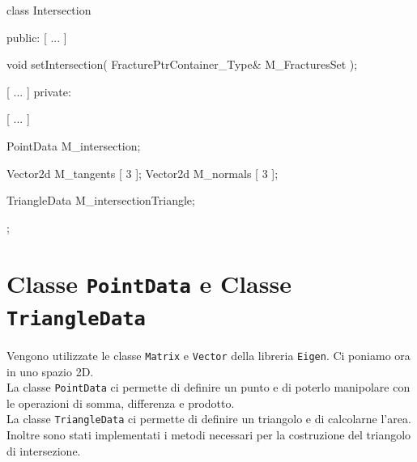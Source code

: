 \begin{Code03_03}[caption={Classe \texttt{Intersection}}]
class Intersection
{
 public:
	[ ... ]
	
	void setIntersection( FracturePtrContainer_Type& M_FracturesSet );
	
	[ ... ]
 private:
	
	[ ... ]	
	
	PointData M_intersection;
	
	Vector2d M_tangents [ 3 ];
	Vector2d M_normals [ 3 ];
	
	TriangleData M_intersectionTriangle;
};	
\end{Code03_03}

\section{Classe \texttt{PointData} e Classe \texttt{TriangleData}}

Vengono utilizzate le classe \texttt{Matrix} e \texttt{Vector} della libreria \texttt{Eigen}.
Ci poniamo ora in uno spazio 2D.\\
La classe \texttt{PointData} ci permette di definire un punto e di poterlo manipolare con le operazioni di somma, differenza e prodotto.\\
La classe \texttt{TriangleData} ci permette di definire un triangolo e di calcolarne l'area. Inoltre sono stati implementati i metodi necessari per la costruzione del triangolo di intersezione.

